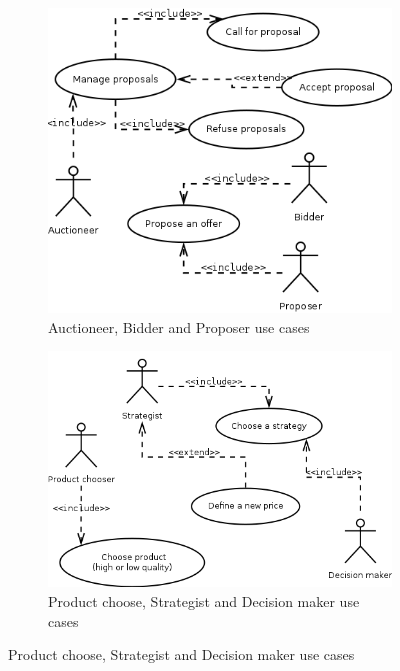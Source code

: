 \documentclass[a4paper,11pt]{report}
\begin{document}
  \begin{figure}[ht!]
    \begin{subfigure}{0.5\textwidth}
       \includegraphics[width=\textwidth]{media/use_cases_1.png}
       \caption{Auctioneer, Bidder and Proposer use cases}
       \label{figure:use_cases_1}
    \end{subfigure}
    \begin{subfigure}{0.5\textwidth}
       \includegraphics[width=\textwidth]{media/use_cases_2.png}
       \caption{Product choose, Strategist and Decision maker use cases}
       \label{figure:use_cases_2}
    \end{subfigure}
    

\end{figure}
\end{document}
